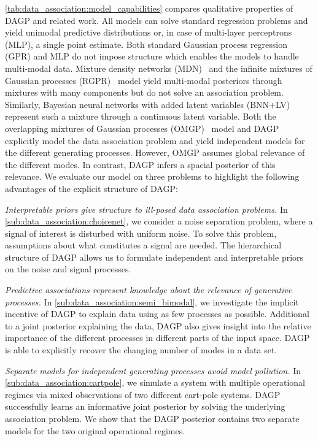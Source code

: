 \cref{tab:data_association:model_capabilities} compares qualitative properties of DAGP and related work.
All models can solve standard regression problems and yield unimodal predictive distributions or, in case of multi-layer perceptrons (MLP), a single point estimate.
Both standard Gaussian process regression (GPR) and MLP do not impose structure which enables the models to handle multi-modal data.
Mixture density networks (MDN)~\parencite{bishop_mixture_1994} and the infinite mixtures of Gaussian processes (RGPR)~\parencite{rasmussen_infinite_2002} model yield multi-modal posteriors through mixtures with many components but do not solve an association problem.
Similarly, Bayesian neural networks with added latent variables (BNN+LV)~\parencite{depeweg_learning_2016} represent such a mixture through a continuous latent variable.
Both the overlapping mixtures of Gaussian processes (OMGP)~\parencite{lazaro-gredilla_overlapping_2012} model and DAGP explicitly model the data association problem and yield independent models for the different generating processes.
However, OMGP assumes global relevance of the different modes.
In contrast, DAGP infers a spacial posterior of this relevance.
We evaluate our model on three problems to highlight the following advantages of the explicit structure of DAGP:

\emph{Interpretable priors give structure to ill-posed data association problems.}
In \cref{sub:data_association:choicenet}, we consider a noise separation problem, where a signal of interest is disturbed with uniform noise.
To solve this problem, assumptions about what constitutes a signal are needed.
The hierarchical structure of DAGP allows us to formulate independent and interpretable priors on the noise and signal processes.

\emph{Predictive associations represent knowledge about the relevance of generative processes.}
In \cref{sub:data_association:semi_bimodal}, we investigate the implicit incentive of DAGP to explain data using as few processes as possible.
Additional to a joint posterior explaining the data, DAGP also gives insight into the relative importance of the different processes in different parts of the input space.
DAGP is able to explicitly recover the changing number of modes in a data set.

\emph{Separate models for independent generating processes avoid model pollution.}
In \cref{sub:data_association:cartpole}, we simulate a system with multiple operational regimes via mixed observations of two different cart-pole systems.
DAGP successfully learns an informative joint posterior by solving the underlying association problem.
We show that the DAGP posterior contains two separate models for the two original operational regimes.


